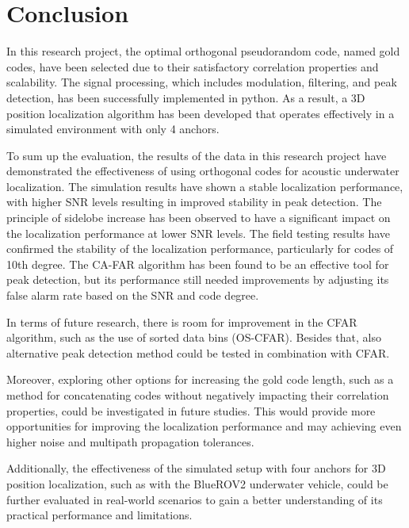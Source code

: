 \chapter{Conclusion}
In this research project, the optimal orthogonal pseudorandom code, named gold codes, have been selected due to their satisfactory correlation properties and scalability. The signal processing, which includes modulation, filtering, and peak detection, has been successfully implemented in python. As a result, a 3D position localization algorithm has been developed that operates effectively in a simulated environment with only 4 anchors.

To sum up the evaluation, the results of the data in this research project have demonstrated the effectiveness of using orthogonal codes for acoustic underwater localization. The simulation results have shown a stable localization performance, with higher SNR levels resulting in improved stability in peak detection. The principle of sidelobe increase has been observed to have a significant impact on the localization performance at lower SNR levels. The field testing results have confirmed the stability of the localization performance, particularly for codes of 10th degree. The CA-FAR algorithm has been found to be an effective tool for peak detection, but its performance still needed improvements by adjusting its false alarm rate based on the SNR and code degree.

In terms of future research, there is room for improvement in the CFAR algorithm, such as the use of sorted data bins (OS-CFAR). Besides that, also alternative peak detection method could be tested in combination with CFAR.

Moreover, exploring other options for increasing the gold code length, such as a method for concatenating codes without negatively impacting their correlation properties, could be investigated in future studies. This would provide more opportunities for improving the localization performance and may achieving even higher noise and multipath propagation tolerances. 

Additionally, the effectiveness of the simulated setup with four anchors for 3D position localization, such as with the BlueROV2 underwater vehicle, could be further evaluated in real-world scenarios to gain a better understanding of its practical performance and limitations.
